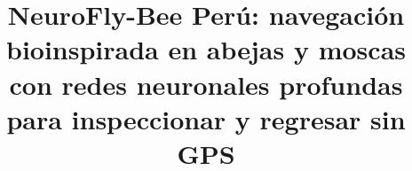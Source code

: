 \documentclass[conference]{IEEEtran}
\begin{document}
\title{NeuroFly-Bee Perú: navegación bioinspirada en abejas y moscas con redes
neuronales profundas para inspeccionar y regresar sin GPS}



\maketitle

















\end{document}
